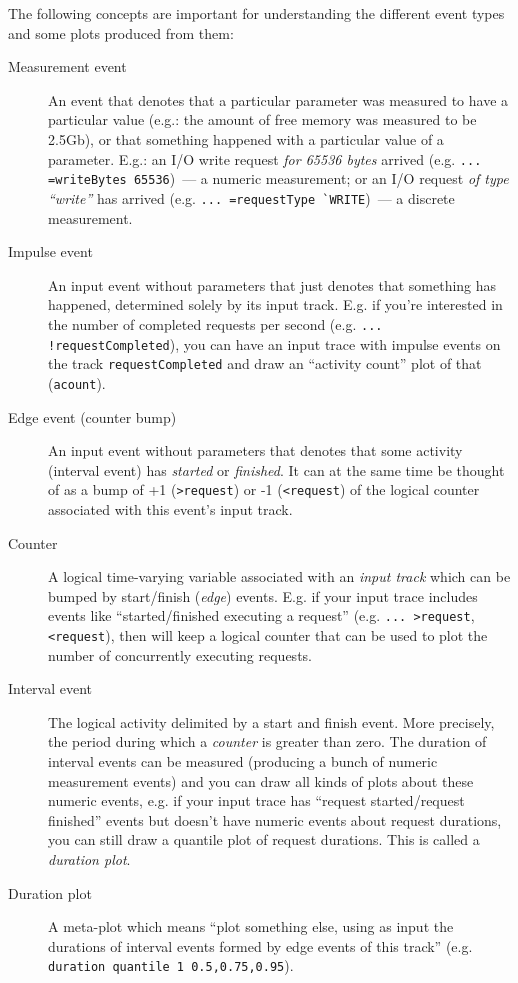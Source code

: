\documentclass{article}
\begin{document}
The following concepts are important for understanding the different event types and some plots produced from them:
\begin{description}
\item[Measurement event] An event that denotes that a particular parameter was measured to have a particular value (e.g.: the amount of free memory was measured to be 2.5Gb), or that something happened with a particular value of a parameter. E.g.: an I/O write request \emph{for 65536 bytes} arrived (e.g. \verb|... =writeBytes 65536|)~--- a numeric measurement; or an I/O request \emph{of type ``write''} has arrived (e.g. \verb|... =requestType `WRITE|)~--- a discrete measurement.
\item[Impulse event] An input event without parameters that just denotes that something has happened, determined solely by its input track. E.g. if you're interested in the number of completed requests per second (e.g. \verb|... !requestCompleted|), you can have an input trace with impulse events on the track \verb|requestCompleted| and draw an ``activity count'' plot of that (\verb|acount|).
\item[Edge event (counter bump)] An input event without parameters that denotes that some activity (interval event) has \emph{started} or \emph{finished}. It can at the same time be thought of as a bump of +1 (\verb|>request|) or -1 (\verb|<request|) of the logical counter associated with this event's input track.
\item[Counter] A logical time-varying variable associated with an \emph{input track} which can be bumped by start/finish (\emph{edge}) events. E.g. if your input trace includes events like ``started/finished executing a request'' (e.g. \verb|... >request|, \verb|<request|), then \timeplot{} will keep a logical counter that can be used to plot the number of concurrently executing requests.
\item[Interval event] The logical activity delimited by a start and finish event. More precisely, the period during which a \emph{counter} is greater than zero. The duration of interval events can be measured (producing a bunch of numeric measurement events) and you can draw all kinds of plots about these numeric events, e.g. if your input trace has ``request started/request finished'' events but doesn't have numeric events about request durations, you can still draw a quantile plot of request durations. This is called a \emph{duration plot}.
\item[Duration plot] A meta-plot which means ``plot something else, using as input the durations of interval events formed by edge events of this track'' (e.g. \verb|duration quantile 1 0.5,0.75,0.95|).
\end{description}
\end{document}
